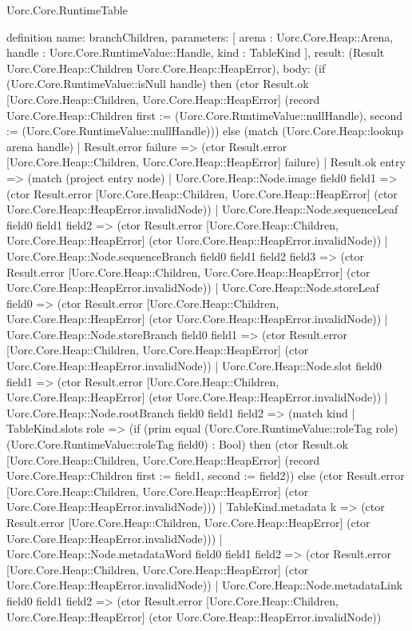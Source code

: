 \begin{lexlean}{Uorc.Core.RuntimeTable}
\begin{semanticmodule}
definition{
  name: branchChildren,
  parameters: [
    arena : Uorc.Core.Heap::Arena,
    handle : Uorc.Core.RuntimeValue::Handle,
    kind : TableKind
  ],
  result: (Result Uorc.Core.Heap::Children Uorc.Core.Heap::HeapError),
  body: (if (Uorc.Core.RuntimeValue::isNull handle) then (ctor Result.ok [Uorc.Core.Heap::Children, Uorc.Core.Heap::HeapError] (record Uorc.Core.Heap::Children {first := (Uorc.Core.RuntimeValue::nullHandle), second := (Uorc.Core.RuntimeValue::nullHandle)})) else (match (Uorc.Core.Heap::lookup arena handle)
    | Result.error failure => (ctor Result.error [Uorc.Core.Heap::Children, Uorc.Core.Heap::HeapError] failure)
    | Result.ok entry => (match (project entry node)
      | Uorc.Core.Heap::Node.image field0 field1 => (ctor Result.error [Uorc.Core.Heap::Children, Uorc.Core.Heap::HeapError] (ctor Uorc.Core.Heap::HeapError.invalidNode))
      | Uorc.Core.Heap::Node.sequenceLeaf field0 field1 field2 => (ctor Result.error [Uorc.Core.Heap::Children, Uorc.Core.Heap::HeapError] (ctor Uorc.Core.Heap::HeapError.invalidNode))
      | Uorc.Core.Heap::Node.sequenceBranch field0 field1 field2 field3 => (ctor Result.error [Uorc.Core.Heap::Children, Uorc.Core.Heap::HeapError] (ctor Uorc.Core.Heap::HeapError.invalidNode))
      | Uorc.Core.Heap::Node.storeLeaf field0 => (ctor Result.error [Uorc.Core.Heap::Children, Uorc.Core.Heap::HeapError] (ctor Uorc.Core.Heap::HeapError.invalidNode))
      | Uorc.Core.Heap::Node.storeBranch field0 field1 => (ctor Result.error [Uorc.Core.Heap::Children, Uorc.Core.Heap::HeapError] (ctor Uorc.Core.Heap::HeapError.invalidNode))
      | Uorc.Core.Heap::Node.slot field0 field1 => (ctor Result.error [Uorc.Core.Heap::Children, Uorc.Core.Heap::HeapError] (ctor Uorc.Core.Heap::HeapError.invalidNode))
      | Uorc.Core.Heap::Node.rootBranch field0 field1 field2 => (match kind
        | TableKind.slots role => (if (prim equal (Uorc.Core.RuntimeValue::roleTag role) (Uorc.Core.RuntimeValue::roleTag field0) : Bool) then (ctor Result.ok [Uorc.Core.Heap::Children, Uorc.Core.Heap::HeapError] (record Uorc.Core.Heap::Children {first := field1, second := field2})) else (ctor Result.error [Uorc.Core.Heap::Children, Uorc.Core.Heap::HeapError] (ctor Uorc.Core.Heap::HeapError.invalidNode)))
        | TableKind.metadata k => (ctor Result.error [Uorc.Core.Heap::Children, Uorc.Core.Heap::HeapError] (ctor Uorc.Core.Heap::HeapError.invalidNode)))
      | Uorc.Core.Heap::Node.metadataWord field0 field1 field2 => (ctor Result.error [Uorc.Core.Heap::Children, Uorc.Core.Heap::HeapError] (ctor Uorc.Core.Heap::HeapError.invalidNode))
      | Uorc.Core.Heap::Node.metadataLink field0 field1 field2 => (ctor Result.error [Uorc.Core.Heap::Children, Uorc.Core.Heap::HeapError] (ctor Uorc.Core.Heap::HeapError.invalidNode))
}
\end{semanticmodule}
\end{lexlean}
